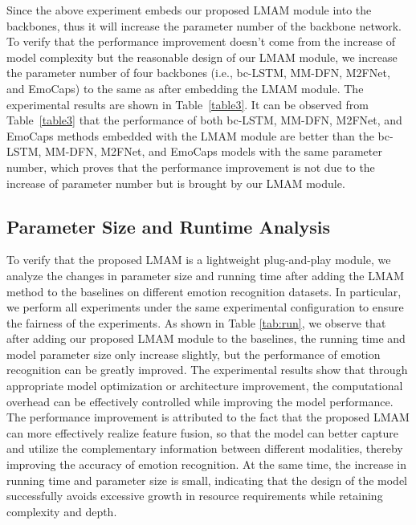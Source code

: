{{Since the above experiment embeds our proposed LMAM module into the backbones, thus it will increase the  parameter number of the backbone network. To verify that the performance improvement doesn't come from the increase of model complexity but the reasonable design of our LMAM module, we increase the parameter number of four backbones (i.e., bc-LSTM, MM-DFN, M2FNet, and EmoCaps) to the same as after embedding the LMAM module. The experimental results are shown in Table~\ref{table3}. It can be observed from Table~\ref{table3} that the performance of both bc-LSTM, MM-DFN, M2FNet, and EmoCaps methods embedded with the LMAM module are better than the bc-LSTM, MM-DFN, M2FNet, and EmoCaps models with the same parameter number, which proves that the performance improvement is not due to the increase of parameter number but is brought by our LMAM module.

{\subsection{Parameter Size and Runtime Analysis}}

{To verify that the proposed LMAM is a lightweight plug-and-play module, we analyze the changes in parameter size and running time after adding the LMAM method to the baselines on different emotion recognition datasets. In particular, we perform all experiments under the same experimental configuration to ensure the fairness of the experiments. As shown in Table \ref{tab:run}, we observe that after adding our proposed LMAM module to the baselines, the running time and model parameter size only increase slightly, but the performance of emotion recognition can be greatly improved. The experimental results show that through appropriate model optimization or architecture improvement, the computational overhead can be effectively controlled while improving the model performance. The performance improvement is attributed to the fact that the proposed LMAM can more effectively realize feature fusion, so that the model can better capture and utilize the complementary information between different modalities, thereby improving the accuracy of emotion recognition. At the same time, the increase in running time and parameter size is small, indicating that the design of the model successfully avoids excessive growth in resource requirements while retaining complexity and depth.}

\begin{table*}[htbp]
	

\end{table*}}}
